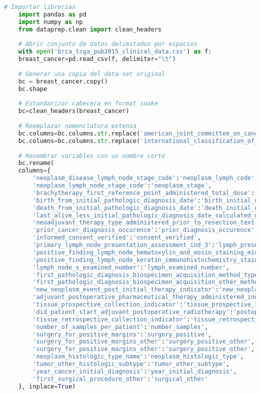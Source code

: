 \begin{lstlisting}[basicstyle=\scriptsize,language=Python, label=renombramiento, caption=Renombramiento de columnas en Python.]
	# Importar librerias
	import pandas as pd
	import numpy as np
	from dataprep.clean import clean_headers
	
	# Abrir conjunto de datos delimitados por espacios
	with open('brca_tcga_pub2015_clinical_data.csv') as f:
	breast_cancer=pd.read_csv(f, delimiter="\t")
	
	# Generar una copia del data-set original
	bc = breast_cancer.copy()
	bc.shape
	
	# Estandarizar cabecera en format snake
	bc=clean_headers(breast_cancer)
	
	# Reemplazar nomenclatura extensa
	bc.columns=bc.columns.str.replace('american_joint_committee_on_cancer_','')
	bc.columns=bc.columns.str.replace('international_classification_of_diseases_for_oncology_third_edition_icd_o_3_','')
	
	# Renombrar variables con un nombre corto
	bc.rename(
	columns={
		'neoplasm_disease_lymph_node_stage_code':'neoplasm_lymph_code',
		'neoplasm_lymph_node_stage_code':'neoplasm_stage',
		'brachytherapy_first_reference_point_administered_total_dose':'brachytherapy',
		'birth_from_initial_pathologic_diagnosis_date':'birth_initial_diagnosis',
		'death_from_initial_pathologic_diagnosis_date':'death_initial_diagnosis',
		'last_alive_less_initial_pathologic_diagnosis_date_calculated_day_value':'last_alive_date',
		'neoadjuvant_therapy_type_administered_prior_to_resection_text':'neoadjuvant_therapy',
		'prior_cancer_diagnosis_occurence':'prior_diagnosis_occurence',
		'informed_consent_verified':'consent_verified',
		'primary_lymph_node_presentation_assessment_ind_3':'lymph_presentation',
		'positive_finding_lymph_node_hematoxylin_and_eosin_staining_microscopy_count':'positive_lymph_hematoxylin',
		'positive_finding_lymph_node_keratin_immunohistochemistry_staining_method_count':'positive_lymph_keratin',
		'lymph_node_s_examined_number':'lymph_examined_number',
		'first_pathologic_diagnosis_biospecimen_acquisition_method_type':'biospecimen_method',
		'first_pathologic_diagnosis_biospecimen_acquisition_other_method_type':'biospecimen_other_method',
		'new_neoplasm_event_post_initial_therapy_indicator':'new_neoplasm_event',
		'adjuvant_postoperative_pharmaceutical_therapy_administered_indicator':'pharmaceutical_therapy',
		'tissue_prospective_collection_indicator':'tissue_prospective_indicator',
		'did_patient_start_adjuvant_postoperative_radiotherapy':'postoperative_radiotherapy',
		'tissue_retrospective_collection_indicator':'tissue_retrospective_indicator',
		'number_of_samples_per_patient':'number_samples',
		'surgery_for_positive_margins':'surgery_positive',
		'surgery_for_positive_margins_other':'surgery_positive_other',
		'surgery_for_positive_margins_other':'surgery_positive_other',
		'neoplasm_histologic_type_name':'neoplasm_histologic_type',
		'tumor_other_histologic_subtype':'tumor_other_subtype',
		'year_cancer_initial_diagnosis':'year_initial_diagnosis',
		'first_surgical_procedure_other':'surgical_other'
	}, inplace=True)
	

\end{lstlisting}
